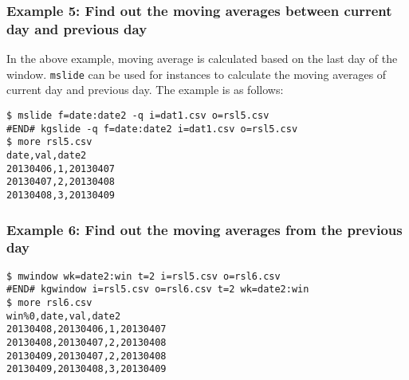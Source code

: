 \subsubsection*{Example 5: Find out the moving averages between current day and previous day}

In the above example, moving average is calculated based on the last day of the window.  \verb|mslide| can be used for instances to calculate the moving averages of current day and previous day. The example is as follows:


\begin{Verbatim}[baselinestretch=0.7,frame=single]
$ mslide f=date:date2 -q i=dat1.csv o=rsl5.csv
#END# kgslide -q f=date:date2 i=dat1.csv o=rsl5.csv
$ more rsl5.csv
date,val,date2
20130406,1,20130407
20130407,2,20130408
20130408,3,20130409
\end{Verbatim}
\subsubsection*{Example 6: Find out the moving averages from the previous day}



\begin{Verbatim}[baselinestretch=0.7,frame=single]
$ mwindow wk=date2:win t=2 i=rsl5.csv o=rsl6.csv
#END# kgwindow i=rsl5.csv o=rsl6.csv t=2 wk=date2:win
$ more rsl6.csv
win%0,date,val,date2
20130408,20130406,1,20130407
20130408,20130407,2,20130408
20130409,20130407,2,20130408
20130409,20130408,3,20130409
\end{Verbatim}
